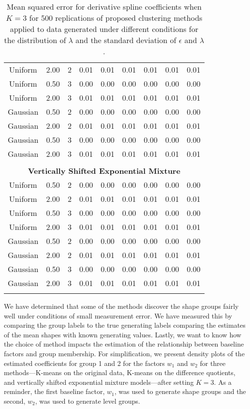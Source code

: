 \begin{table}[ht]
\begin{center}
\begin{tabular}{ccc|cccccc}
  Uniform & 2.00 &   2 & 0.01 & 0.01 & 0.01 & 0.01 & 0.01 & 0.01 \\ 
  Uniform & 0.50 &   3 & 0.00 & 0.00 & 0.00 & 0.00 & 0.00 & 0.00 \\ 
  Uniform & 2.00 &   3 & 0.01 & 0.01 & 0.01 & 0.01 & 0.01 & 0.01 \\ 
  Gaussian & 0.50 &   2 & 0.00 & 0.00 & 0.00 & 0.00 & 0.00 & 0.00 \\ 
  Gaussian & 2.00 &   2 & 0.01 & 0.01 & 0.01 & 0.01 & 0.01 & 0.01 \\ 
  Gaussian & 0.50 &   3 & 0.00 & 0.00 & 0.00 & 0.00 & 0.00 & 0.00 \\ 
  Gaussian & 2.00 &   3 & 0.01 & 0.01 & 0.01 & 0.01 & 0.01 & 0.01 \\ 
   \\ \multicolumn{9}{c}{\textbf{Vertically Shifted Exponential Mixture}}\\Uniform & 0.50 &   2 & 0.00 & 0.00 & 0.00 & 0.00 & 0.00 & 0.00 \\ 
  Uniform & 2.00 &   2 & 0.01 & 0.01 & 0.01 & 0.01 & 0.01 & 0.01 \\ 
  Uniform & 0.50 &   3 & 0.00 & 0.00 & 0.00 & 0.00 & 0.00 & 0.00 \\ 
  Uniform & 2.00 &   3 & 0.01 & 0.01 & 0.01 & 0.01 & 0.01 & 0.01 \\ 
  Gaussian & 0.50 &   2 & 0.00 & 0.00 & 0.00 & 0.00 & 0.00 & 0.00 \\ 
  Gaussian & 2.00 &   2 & 0.01 & 0.01 & 0.01 & 0.01 & 0.01 & 0.01 \\ 
  Gaussian & 0.50 &   3 & 0.00 & 0.00 & 0.00 & 0.00 & 0.00 & 0.00 \\ 
  Gaussian & 2.00 &   3 & 0.01 & 0.01 & 0.01 & 0.01 & 0.01 & 0.01 \\ 
   \thickhline\end{tabular}
\caption{Mean squared error for derivative spline coefficients when $K=3$ for 500 replications of proposed clustering methods applied to data generated under different conditions for the distribution of $\lambda$ and the standard deviation of $\epsilon$ and $\lambda$.}
\label{tab:mse3}
\end{center}
\end{table}
We have determined that some of the methods discover the shape groups fairly well under conditions of small measurement error. We have measured this by comparing the group labels to the true generating labels comparing the estimates of the mean shapes with known generating values. Lastly, we want to know how the choice of method impacts the estimation of the relationship between baseline factors and group membership. For simplification, we present density plots of the estimated coefficients for group 1 and 2 for the factors $w_{1}$ and $w_{2}$ for three methods---K-means on the original data, K-means on the difference quotients, and vertically shifted exponential mixture models---after setting $K=3$. As a reminder, the first baseline factor, $w_{1}$, was used to generate shape groups and the second, $w_{2}$, was used to generate level groups. 

